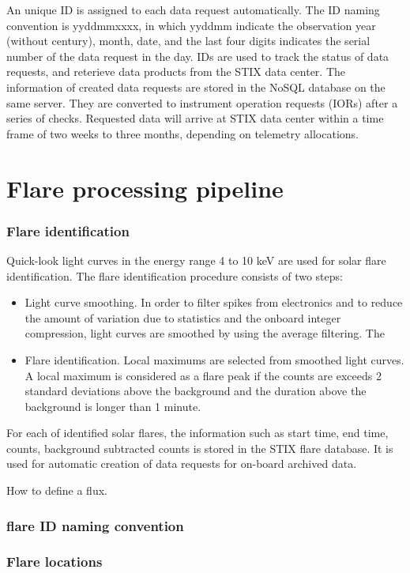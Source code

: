 \documentclass{aa}
\begin{document}
An unique ID is assigned to each data request automatically.
The ID naming convention is yyddmmxxxx, in which yyddmm indicate the observation year (without century), month, date,
and the last four digits indicates the serial number of the data request in the day.
IDs are used to track the status of data requests, and reterieve data products from the
STIX data center.
The information of created data requests are stored in the NoSQL database on the same server.
They are converted to instrument operation requests (IORs) after a series of checks.
Requested data will arrive at STIX data center within a time frame of two weeks to three months, depending on
telemetry allocations.


\section{Flare processing pipeline}

\subsubsection{Flare identification}
Quick-look light curves in the energy range 4 to 10 keV are used for solar flare identification.  The flare identification procedure consists of  two steps:
\begin{itemize}
\item Light curve smoothing. In order to filter spikes from electronics and to reduce the amount of variation due to statistics and the onboard integer compression, light curves are smoothed by using the average filtering. The
\item Flare identification. Local maximums are selected from smoothed light curves.  A local maximum is considered as a flare peak if the counts are exceeds 2 standard deviations above the background and the duration above the background is longer than 1 minute.
\end{itemize}

For each of identified solar flares,   the  information such as start time, end time, counts, background subtracted counts is stored in the STIX flare database.   It is used for automatic creation of data requests for on-board archived data.

How to define a flux.


\subsubsection{flare ID naming convention}
\subsubsection{Flare locations}
\end{document}
